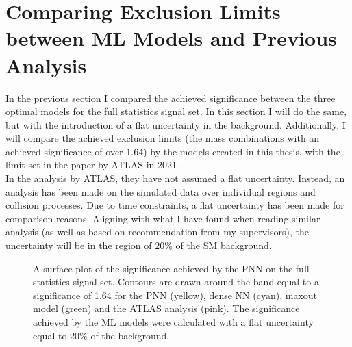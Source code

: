 \section{Comparing Exclusion Limits between ML Models and Previous Analysis}
In the previous section I compared the achieved significance between 
the three optimal models for the full statistics signal set. In this section 
I will do the same, but with the introduction of a flat uncertainty in the background.
Additionally, I will compare the achieved exclusion limits (the mass combinations with an achieved 
significance of over 1.64) by the models created in this thesis, with the limit set in the paper by ATLAS 
in 2021 \cite{atlas_search_2021}.
\\
In the analysis by ATLAS, they have not assumed a flat uncertainty. Instead, an analysis has been made on the simulated data 
over individual regions and collision processes. Due to time constraints, a flat uncertainty has been made for comparison 
reasons. Aligning with what I have found when reading similar analysis (as well as based on recommendation from my supervisors), 
the uncertainty will be in the region of $20\%$ of the \ac{SM} background.\\
\begin{figure}
    \caption{A surface plot of the significance achieved by the \ac{PNN} on the full statistics signal set. Contours are 
    drawn around the band equal to a significance of 1.64 for the \ac{PNN} (yellow), dense \ac{NN} (cyan), maxout model (green)
    and the ATLAS analysis (pink). The significance achieved by the \ac{ML} models were calculated with a flat uncertainty equal 
    to $20\%$ of the background.}
    \label{fig:compLimit20}
\end{figure}
